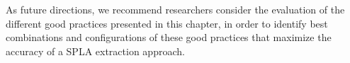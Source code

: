 \documentclass[graybox]{svmult}
\begin{document}
As future directions, we recommend researchers consider the evaluation of the different good practices presented in this chapter, in order to identify best combinations and configurations of these good practices that maximize the accuracy of a SPLA extraction approach. 

%



%

\printindex
\end{document}

